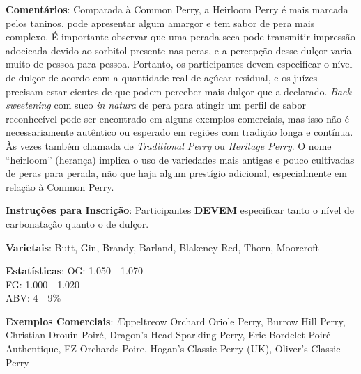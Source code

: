 \textbf{Comentários}: Comparada à Common Perry, a Heirloom Perry é mais marcada pelos taninos, pode apresentar algum amargor e tem sabor de pera mais complexo. É importante observar que uma perada seca pode transmitir impressão adocicada devido ao sorbitol presente nas peras, e a percepção desse dulçor varia muito de pessoa para pessoa. Portanto, os participantes devem especificar o nível de dulçor de acordo com a quantidade real de açúcar residual, e os juízes precisam estar cientes de que podem perceber mais dulçor que a declarado. \textit{Back-sweetening} com suco \textit{in natura} de pera para atingir um perfil de sabor reconhecível pode ser encontrado em alguns exemplos comerciais, mas isso não é necessariamente autêntico ou esperado em regiões com tradição longa e contínua. Às vezes também chamada de \textit{Traditional Perry} ou \textit{Heritage Perry}. O nome “heirloom” (herança) implica o uso de variedades mais antigas e pouco cultivadas de peras para perada, não que haja algum prestígio adicional, especialmente em relação à Common Perry.

\textbf{Instruções para Inscrição}: Participantes \textbf{DEVEM} especificar tanto o nível de carbonatação quanto o de dulçor.

\textbf{Varietais}: Butt, Gin, Brandy, Barland, Blakeney Red, Thorn, Moorcroft

\textbf{Estatísticas}: OG: 1.050 - 1.070 \\
\phantom{ } \hspace{16.5mm} FG: 1.000 - 1.020 \\
\phantom{ } \hspace{16.5mm} ABV: 4 - 9\%

\textbf{Exemplos Comerciais}: Æppeltreow Orchard Oriole Perry, Burrow Hill Perry, Christian Drouin Poiré, Dragon's Head Sparkling Perry, Eric Bordelet Poiré Authentique, EZ Orchards Poire, Hogan's Classic Perry (UK), Oliver's Classic Perry
